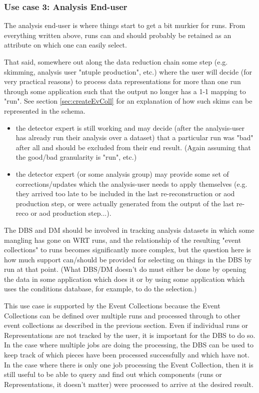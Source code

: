 \documentclass{cmspaper}
\begin{document}
\subsubsection{Use case 3: Analysis End-user}

  The analysis end-user is where things start to get a bit murkier for runs.
From everything written above, runs can and should probably be retained as 
an attribute on which one can easily select.

  That said, somewhere out along the data reduction chain some step (e.g. 
skimming, analysis user "ntuple production", etc.) where the user will
decide (for very practical reasons) to process data representations for more
than one run through some application such that the output no longer has
a 1-1 mapping to "run". See section \ref{sec:createEvColl} for an explanation of how such 
skims can be represented in the schema.


\begin{itemize}
\item the detector expert is still working and may decide (after the 
     analysis-user has already run their analysis over a dataset) that a
     particular run was "bad" after all and should be excluded from their
     end result. (Again assuming that the good/bad granularity is "run", etc.)
\item the detector expert (or some analysis group) may provide some set of
     corrections/updates which the analysis-user needs to apply themselves
     (e.g. they arrived too late to be included in the last re-reconstruction
     or aod production step, or were actually generated from the output of
     the last re-reco or aod production step...). 
\end{itemize}

The DBS and DM should be involved in tracking analysis datasets in which
some mangling has gone on WRT runs, and the relationship of the resulting 
"event collections" to runs becomes significantly more complex, but the 
question here is how much support can/should be provided for selecting on 
things in the DBS by run at that point. (What DBS/DM doesn't do must either 
be done by opening the data in some application which does it or by using 
some application which uses the conditions database, for example, to do the
selection.)

This use case is supported by the Event Collections because the Event Collections 
can be defined over multiple runs and processed through to other event collections
as described in the previous section.  Even if individual runs or Representations 
are not tracked by the user, it is important for the DBS to do so.  In the case 
where multiple jobs are doing the processing, the DBS can be used to keep track of
which pieces have been processed successfully and which have not.  In the case
where there is only one job processing the Event Collection, then it is still 
useful to be able to query and find out which components 
(runs or Representations, it doesn't matter) were processed to 
arrive at the desired result.
\end{document}
